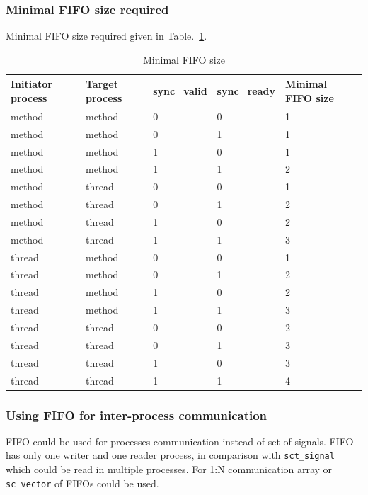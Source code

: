 \subsubsection{Minimal FIFO size required}

Minimal FIFO size required given in Table.~\ref{tab:fifo_size}.
\begin{table}
\begin{tabular}{|l|l|l|l|l|}
\hline
Initiator process & Target process & sync\_valid & sync\_ready & Minimal FIFO size \\
\hline
method & method & 0 & 0 & 1 \\
method & method & 0 & 1 & 1 \\
method & method & 1 & 0 & 1 \\
method & method & 1 & 1 & 2 \\
method & thread & 0 & 0 & 1 \\
method & thread & 0 & 1 & 2 \\
method & thread & 1 & 0 & 2 \\
method & thread & 1 & 1 & 3 \\
thread & method & 0 & 0 & 1 \\
thread & method & 0 & 1 & 2 \\
thread & method & 1 & 0 & 2 \\
thread & method & 1 & 1 & 3 \\
thread & thread & 0 & 0 & 2 \\
thread & thread & 0 & 1 & 3 \\
thread & thread & 1 & 0 & 3 \\
thread & thread & 1 & 1 & 4 \\
\hline
\end{tabular}
\caption{Minimal FIFO size}
\label{tab:fifo_size}
\end{table}

\subsubsection{Using FIFO for inter-process communication}

FIFO could be used for processes communication instead of set of signals. FIFO has only one writer and one reader process, in comparison with {\tt sct\_signal} which could be read in multiple processes. For 1:N communication array or {\tt sc\_vector} of FIFOs could be used.

